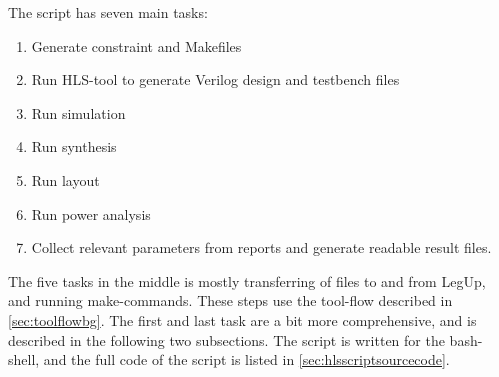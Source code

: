 The script has seven main tasks:
\begin{enumerate}
    \item Generate constraint and Makefiles
    \item Run HLS-tool to generate Verilog design and testbench files
    \item Run simulation
    \item Run synthesis
    \item Run layout
    \item Run power analysis
    \item Collect relevant parameters from reports and generate readable result files.
\end{enumerate}
The five tasks in the middle is mostly transferring of files to and from LegUp, and running make-commands. These steps use the tool-flow described in \cref{sec:toolflowbg}. The first and last task are a bit more comprehensive, and is described in the following two subsections. The script is written for the bash-shell, and the full code of the script is listed in \cref{sec:hlsscriptsourcecode}.


